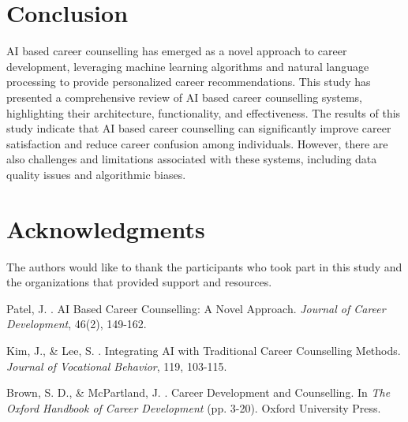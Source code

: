 \documentclass[12pt,a4paper,twocolumn]{article}
\begin{document}
\section{Conclusion}
AI based career counselling has emerged as a novel approach to career development, leveraging machine learning algorithms and natural language processing to provide personalized career recommendations. This study has presented a comprehensive review of AI based career counselling systems, highlighting their architecture, functionality, and effectiveness. The results of this study indicate that AI based career counselling can significantly improve career satisfaction and reduce career confusion among individuals. However, there are also challenges and limitations associated with these systems, including data quality issues and algorithmic biases.

\section*{Acknowledgments}
The authors would like to thank the participants who took part in this study and the organizations that provided support and resources.


\begin{thebibliography}{99}

Patel, J. . AI Based Career Counselling: A Novel Approach. \emph{Journal of Career Development}, 46(2), 149-162.

Kim, J., \& Lee, S. . Integrating AI with Traditional Career Counselling Methods. \emph{Journal of Vocational Behavior}, 119, 103-115.

Brown, S. D., \& McPartland, J. . Career Development and Counselling. In \emph{The Oxford Handbook of Career Development} (pp. 3-20). Oxford University Press.

\end{thebibliography}
\end{document}
